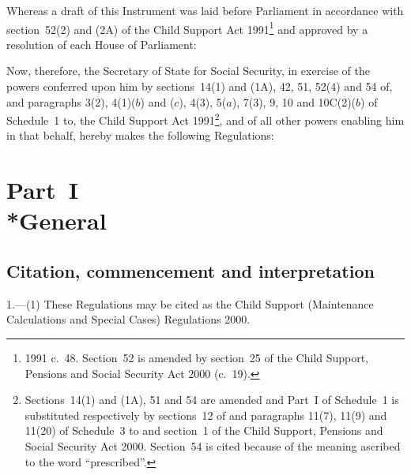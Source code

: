 \documentclass[12pt,a4paper]{article}
\title{\regstitle}
\author{S.I. 2001 No. 155}
\date{Made 18th January 2001\\
Coming into force in accordance with regulation~1(4) and (5)
}
\begin{document}
\maketitle

\noindent
Whereas a draft of this Instrument was laid before Parliament in accordance with section~52(2) and (2A) of the Child Support Act 1991\footnote{1991 c.\ 48. Section~52 is amended by section~25 of the Child Support, Pensions and Social Security Act 2000 (c.\ 19).} and approved by a resolution of each House of Parliament:

Now, therefore, the Secretary of State for Social Security, in exercise of the powers conferred upon him by sections~14(1) and (1A), 42, 51, 52(4) and 54 of, and paragraphs 3(2), 4(1)($b$)  and ($c$), 4(3), 5($a$), 7(3), 9, 10 and 10C(2)($b$)  of Schedule~1 to, the Child Support Act 1991\footnote{Sections~14(1) and (1A), 51 and 54 are amended and Part~I of Schedule~1 is substituted respectively by sections~12 of and paragraphs 11(7), 11(9) and 11(20) of Schedule~3 to and section~1 of the Child Support, Pensions and Social Security Act 2000. Section~54 is cited because of the meaning ascribed to the word “prescribed”.}, and of all other powers enabling him in that behalf, hereby makes the following Regulations: 

\enlargethispage{\baselineskip}

{\sloppy

\tableofcontents

}

\bigskip

\setcounter{secnumdepth}{-2}

\section[Part~I --- General]{Part~I\\*General}

\renewcommand\parthead{--- Part~I}

\subsection[1. Citation, commencement and interpretation]{Citation, commencement and interpretation}

1.---(1)  These Regulations may be cited as the Child Support (Maintenance Calculations and Special Cases) Regulations 2000.
\end{document}
